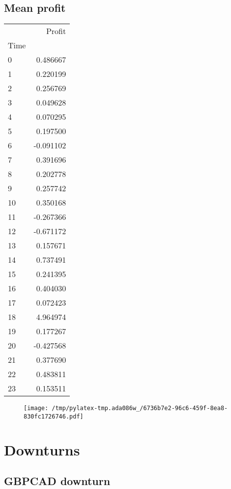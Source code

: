 \documentclass{article}%
\begin{document}
\subsection{Mean profit }%
\label{subsec:Meanprofit}%
\begin{tabular}{lr}
\toprule
{} &    Profit \\
Time &           \\
\midrule
0    &  0.486667 \\
1    &  0.220199 \\
2    &  0.256769 \\
3    &  0.049628 \\
4    &  0.070295 \\
5    &  0.197500 \\
6    & -0.091102 \\
7    &  0.391696 \\
8    &  0.202778 \\
9    &  0.257742 \\
10   &  0.350168 \\
11   & -0.267366 \\
12   & -0.671172 \\
13   &  0.157671 \\
14   &  0.737491 \\
15   &  0.241395 \\
16   &  0.404030 \\
17   &  0.072423 \\
18   &  4.964974 \\
19   &  0.177267 \\
20   & -0.427568 \\
21   &  0.377690 \\
22   &  0.483811 \\
23   &  0.153511 \\
\bottomrule
\end{tabular}
%


\begin{figure}[htbp]%
\centering%
\texttt{[image: /tmp/pylatex-tmp.ada086w\_/6736b7e2-96c6-459f-8ea8-830fc1726746.pdf]}%
\end{figure}

%
\newpage %
\section{Downturns}%
\label{sec:Downturns}%
\subsection{GBPCAD downturn}%
\label{subsec:GBPCADdownturn}%
\end{document}
